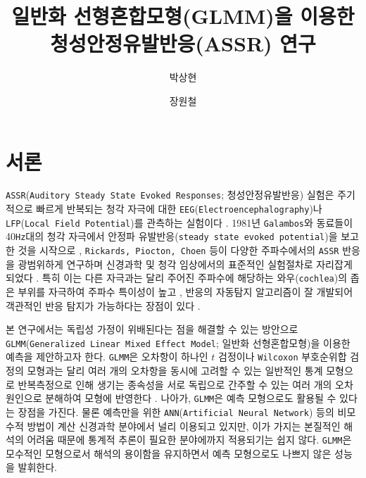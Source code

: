 \documentclass[10pt,onecolumn,twoside,a4size]{gsag3jnl}
\title{일반화 선형혼합모형(GLMM)을 이용한 청성안정유발반응(ASSR) 연구}
\author[1]{박상현}
\author[$\ast$,1]{장원철}
\affil[]{대한민국 서울특별시 08826, 서울대학교 자연과학대학 통계학과}
\affil[$\ast$]{지도교수}
\begin{document}
\maketitle
\thispagestyle{firststyle}
\logomark
\marginmark
\firstpagefootnote

\vspace{-34pt}%

\setcounter{tocdepth}{2}
\sffamily
\tableofcontents

\normalfont
\section{서론}
\texttt{ASSR}(\texttt{Auditory Steady State Evoked Responses}; 청성안정유발반응) 실험은 주기적으로 빠르게 반복되는 청각 자극에 대한 \texttt{EEG}(\texttt{Electroencephalography})나 \texttt{LFP}(\texttt{Local Field Potential})를 관측하는 실험이다 \texttt{\citep{bohorquez2008generation}}. 1981년 \texttt{Galambos}와 동료들이 40\texttt{Hz}대의 청각 자극에서 안정파 유발반응(\texttt{steady state evoked potential})을 보고한 것을 시작으로 \texttt{\citep{galambos198140}}, \texttt{Rickards, Piocton, Choen} 등이 다양한 주파수에서의 \texttt{ASSR} 반응을 광범위하게 연구하며 신경과학 및 청각 임상에서의 표준적인 실험절차로 자리잡게 되었다 \texttt{\citep{rickards1982steady, picton1987potentials, kuwada1986scalp, cohen1991comparison}}. 특히 이는 다른 자극과는 달리 주어진 주파수에 해당하는 와우(\texttt{cochlea})의 좁은 부위를 자극하여 주파수 특이성이 높고 \texttt{\citep{john2000master}}, 반응의 자동탐지 알고리즘이 잘 개발되어 객관적인 반응 탐지가 가능하다는 장점이 있다 \texttt{\citep{cone2002auditory}}.
 
본 연구에서는 독립성 가정이 위배된다는 점을 해결할 수 있는 방안으로 \texttt{GLMM}(\texttt{Generalized Linear Mixed Effect Model}; 일반화 선형혼합모형)을 이용한 예측을 제안하고자 한다. \texttt{GLMM}은 오차항이 하나인 $t$ 검정이나 \texttt{Wilcoxon} 부호순위합 검정의 모형과는 달리 여러 개의 오차항을 동시에 고려할 수 있는 일반적인 통계 모형으로 반복측정으로 인해 생기는 종속성을 서로 독립으로 간주할 수 있는 여러 개의 오차 원인으로 분해하여 모형에 반영한다 \texttt{\citep{pinheiro2006mixed, agresti2000random}}. 나아가, \texttt{GLMM}은 예측 모형으로도 활용될 수 있다는 장점을 가진다. 물론 예측만을 위한 \texttt{ANN}(\texttt{Artificial Neural Network}) 등의 비모수적 방법이 계산 신경과학 분야에서 널리 이용되고 있지만, 이가 가지는 본질적인 해석의 어려움 때문에 통계적 추론이 필요한 분야에까지 적용되기는 쉽지 않다. \texttt{GLMM}은 모수적인 모형으로서 해석의 용이함을 유지하면서 예측 모형으로도 나쁘지 않은 성능을 발휘한다.
\end{document}
